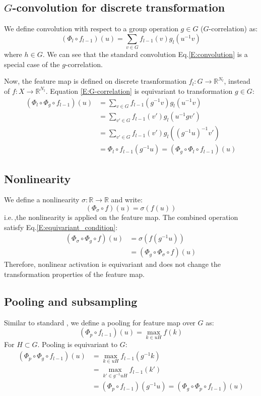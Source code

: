 \documentclass{article}
\begin{document}
\subsection*{$G$-convolution for discrete transformation}
We define convolution with respect to a group operation $g\in G$ ($G$-correlation) as:
\begin{equation}
    (\Phi_l \circ f_{l-1})(u) = \sum_{v\in G} f_{l-1}(v) g_l(u^{-1}v) \label{E:G-correlation}
\end{equation}
where $h \in G$.
We can see that the standard convolution Eq.\eqref{E:convolution} is a special case of the $g$-correlation.

Now, the feature map is defined on discrete 
trasnformation $f_l\colon G\to \mathbb{R}^{N_l}$, instead of $f\colon X\to \mathbb{R}^{N_l}$. 
Equation \eqref{E:G-correlation} is equivariant to transformation $g \in G$:
\begin{align*}
    (\Phi_l \circ \Phi_g \circ f_{l-1})(u) 
        &= \sum_{v\in G} f_{l-1}(g^{-1}v) g_l(u^{-1}v) \\
        &= \sum_{v'\in G} f_{l-1}(v') g_l(u^{-1}gv') \\
        &= \sum_{v'\in G} f_{l-1}(v') g_l((g^{-1}u)^{-1}v') \\
        &= \Phi_l \circ f_{l-1} (g^{-1}u) = (\Phi_g \circ \Phi_l \circ f_{l-1})(u)
\end{align*}

\subsection*{Nonlinearity}
We define a nonlinearity $\sigma\colon \mathbb{R} \to \mathbb{R}$ and write:
\begin{equation}
    (\Phi_{\sigma} \circ f) (u) = \sigma(f(u))
\end{equation}
i.e.\,,the nonlinearity is applied on the feature map. 
The combined operation satisfy Eq.\eqref{E:equivariant_condition}: 
\begin{align*}
    (\Phi_{\sigma} \circ \Phi_g \circ f)(u) &= \sigma(f(g^{-1}u)) \\
    &= (\Phi_g \circ \Phi_{\sigma} \circ f)(u)
\end{align*}
Therefore, nonlinear activation is equivariant 
and does not change the transformation properties of the feature map.

\subsection*{Pooling and subsampling}
Similar to standard , we define a pooling for feature map over $G$ as:
\begin{equation}
    (\Phi_p \circ f_{l-1})(u) = \max_{k \in uH} f(k)
\end{equation}
For $H \subset G$. Pooling is equivariant to $G$:
\begin{align*}
    (\Phi_p \circ \Phi_g \circ f_{l-1})(u) &= \max_{k \in uH} f_{l-1}(g^{-1}k) \\
        & = \max_{k'\in g^{-1}uH} f_{l-1}(k') \\
        &= (\Phi_p \circ f_{l-1})(g^{-1}u) = (\Phi_g \circ \Phi_p \circ f_{l-1})(u)
\end{align*}
\end{document}
